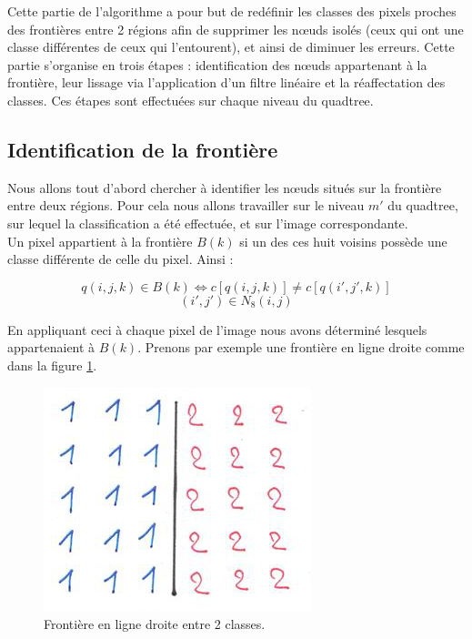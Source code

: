 Cette partie de l'algorithme a pour but de redéfinir les classes des pixels proches des frontières entre 2 régions afin de supprimer les nœuds isolés (ceux qui ont une classe différentes de ceux qui l'entourent), et ainsi de diminuer les erreurs. Cette partie s'organise en trois étapes : identification des nœuds appartenant à la frontière, leur lissage via l'application d'un filtre linéaire et la réaffectation des classes. Ces étapes sont effectuées sur chaque niveau du quadtree.

\subsection{Identification de la frontière}
	Nous allons tout d'abord chercher à identifier les nœuds situés sur la frontière entre deux régions. Pour cela nous allons travailler sur le niveau $m'$ du quadtree, sur lequel la classification a été effectuée, et sur l'image correspondante.\\

	Un pixel appartient à la frontière $B(k)$ si un des ces huit voisins possède une classe différente de celle du pixel. Ainsi :

	\[ q(i,j,k) \in B(k) \Leftrightarrow c[q(i,j,k)] \ne c[q(i',j',k)] \]
	\[ (i',j') \in N_8(i,j) \]

	En appliquant ceci à chaque pixel de l'image nous avons déterminé lesquels appartenaient à $B(k)$. Prenons par exemple une frontière en ligne droite comme dans la figure \ref{fig:bordure}.

	\begin{figure}[H]
		\centering
		\includegraphics[scale=0.75]{images/bordure.jpg}
		\caption{Frontière en ligne droite entre 2 classes.}
		\label{fig:bordure}
	\end{figure}

